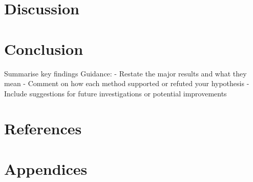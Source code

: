 \documentclass{tufte-handout}
\begin{document}
\section{Discussion}
\vspace{10em} %

\section{Conclusion}
Summarise key findings
Guidance:
 - Restate the major results and what they mean
 - Comment on how each method supported or refuted your hypothesis
 - Include suggestions for future investigations or potential improvements
\vspace{10em} %

\section{References}



\section{Appendices}
\end{document}
